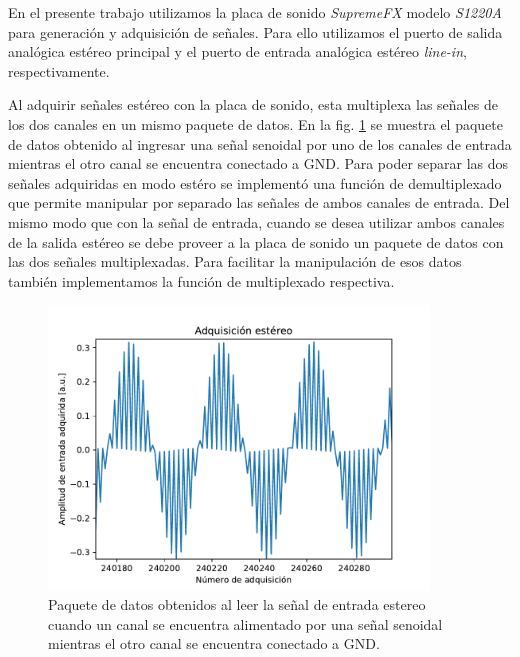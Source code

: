 \documentclass[a4paper,11pt]{article}
\begin{document}
En el presente trabajo utilizamos la placa de sonido \emph{SupremeFX} modelo \emph{S1220A} para generación y adquisición de señales.  Para ello
utilizamos el puerto de salida analógica estéreo principal y el puerto
de entrada analógica estéreo \emph{line-in}, respectivamente.

Al adquirir señales estéreo con la placa de sonido, esta multiplexa las
señales de los dos canales en un mismo paquete de datos. En la
fig. \ref{fig:multiplexado} se muestra el paquete de datos
obtenido al ingresar una señal senoidal por uno de los canales de
entrada mientras el otro canal se encuentra conectado a
GND.
Para poder separar las dos señales adquiridas en modo estéro se
implementó una función de demultiplexado que permite manipular por
separado las señales de ambos canales de entrada.  Del mismo modo que
con la señal de entrada, cuando se desea utilizar ambos canales de la
salida estéreo se debe proveer a la placa de sonido un paquete de datos
con las dos señales multiplexadas. Para facilitar la manipulación de esos
datos también implementamos la función de multiplexado respectiva.

    \begin{figure}[!h] 
        \centering
        \includegraphics[width=0.9\textwidth]{imagenes/estereo.pdf}
        \caption{Paquete de datos obtenidos al leer la señal de entrada
estereo cuando un canal se encuentra alimentado por una señal senoidal
mientras el otro canal se encuentra conectado a GND.}
        \label{fig:multiplexado} 
    \end{figure}
\end{document}
